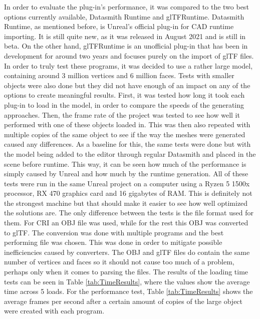 In order to evaluate the plug-in's performance, it was compared to the two best options currently available, Datasmith Runtime and glTFRuntime. Datasmith Runtime, as mentioned before, is Unreal's official plug-in for CAD runtime importing. It is still quite new, as it was released in August 2021 and is still in beta\cite{bib:DSRunDoc}. On the other hand, glTFRuntime is an unofficial plug-in that has been in development for around two years and focuses purely on the import of glTF files\cite{bib:glTFRun}.\\
In order to truly test these programs, it was decided to use a rather large model, containing around 3 million vertices and 6 million faces. Tests with smaller objects were also done but they did not have enough of an impact on any of the options to create meaningful results. First, it was tested how long it took each plug-in to load in the model, in order to compare the speeds of the generating approaches. Then, the frame rate of the project was tested to see how well it performed with one of these objects loaded in. This was then also repeated with multiple copies of the same object to see if the way the meshes were generated caused any differences. As a baseline for this, the same tests were done but with the model being added to the editor through regular Datasmith and placed in the scene before runtime. This way, it can be seen how much of the performance is simply caused by Unreal and how much by the runtime generation. All of these tests were run in the same Unreal project on a computer using a Ryzen 5 1500x processor, RX 470 graphics card and 16 gigabytes of RAM. This is definitely not the strongest machine but that should make it easier to see how well optimized the solutions are. The only difference between the tests is the file format used for them. For \acs{CRI} an OBJ file was used, while for the rest this OBJ was converted to glTF. The conversion was done with multiple programs and the best performing file was chosen. This was done in order to mitigate possible inefficiencies caused by converters. The OBJ and glTF files do contain the same number of vertices and faces so it should not cause too much of a problem, perhaps only when it comes to parsing the files. The results of the loading time tests can be seen in Table \ref{tab:TimeResults}, where the values show the average time across 5 loads. For the performance test, Table \ref{tab:TimeResults} shows the average frames per second after a certain amount of copies of the large object were created with each program.\\


